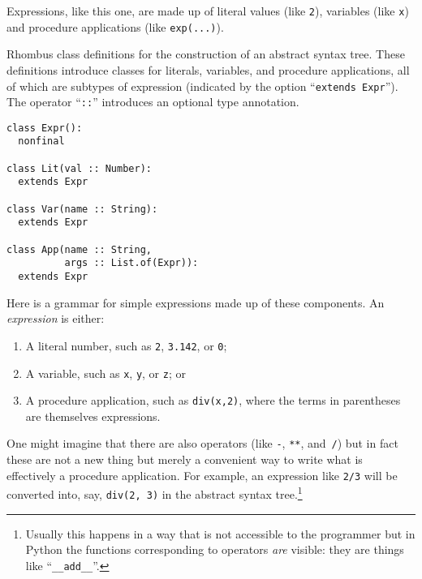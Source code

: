 \documentclass[11pt, a4paper]{article}
\newcommand{\cd}[1]{\texttt{#1}}
\begin{document}
Expressions, like this one, are made up of literal values (like
\cd{2}), variables (like \cd{x}) and procedure applications (like
\cd{exp(...)}). 
\begin{marginfigure}
  \caption{Rhombus class definitions for the construction of an
    abstract syntax tree. These definitions introduce classes for
    literals, variables, and procedure applications, all of which are
    subtypes of expression (indicated by the option ``\cd{extends
      Expr}''). The operator ``\cd{::}'' introduces an optional type
    annotation.\label{fig:class-defs}}\footnotesize
\begin{verbatim}
class Expr():
  nonfinal

class Lit(val :: Number):
  extends Expr

class Var(name :: String):
  extends Expr

class App(name :: String,
          args :: List.of(Expr)):
  extends Expr
\end{verbatim}
\end{marginfigure}
Here is a grammar for simple expressions made up of these
components. An \emph{expression} is either:
\begin{enumerate}
\item A literal number, such as \cd{2}, \cd{3.142}, or \cd{0};
\item A variable, such as \cd{x}, \cd{y}, or \cd{z}; or
\item A procedure application, such as \cd{div(x,2)}, where the terms
  in parentheses are themselves expressions.
\end{enumerate}
One might imagine that there are also operators (like
\cd{-}, \cd{**}, and~\cd{/}) but in fact these are not a new thing but
merely a convenient way to write what is effectively a procedure
application. For example, an expression like \cd{2/3} will be
converted into, say, \cd{div(2, 3)} in the abstract syntax
tree.\footnote{Usually this happens in a way that is not accessible to
  the programmer but in Python the functions corresponding to
  operators \emph{are} visible: they are things like
  ``\cd{__add__}''.}
\end{document}

